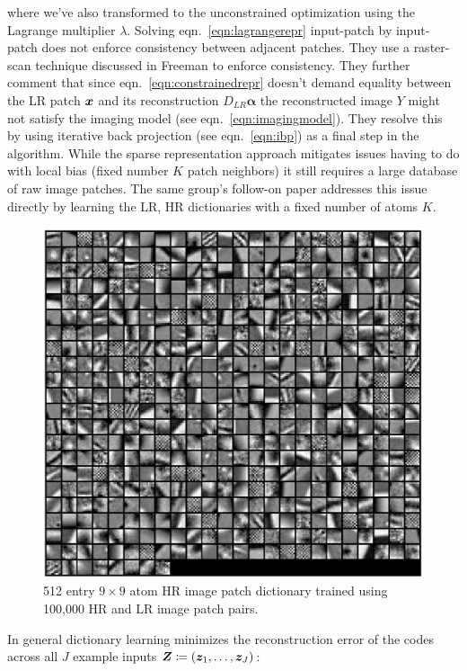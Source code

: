 where we've also transformed to the unconstrained optimization using the Lagrange multiplier \(\lambda\).
%
Solving eqn.~\eqref{eqn:lagrangerepr} input-patch by input-patch does not enforce consistency between adjacent patches.
%
They use a raster-scan technique discussed in Freeman \etal\cite{freeman2002example} to enforce consistency.
%
They further comment that since eqn.~\eqref{eqn:constrainedrepr} doesn't demand equality between the LR patch \(\bm{x}\) and its reconstruction \(D_{LR}\bm{\alpha}\) the reconstructed image \(Y\) might not satisfy the imaging model (see eqn.~\eqref{eqn:imagingmodel}).
%
They resolve this by using iterative back projection (see eqn.~\eqref{eqn:ibp}) as a final step in the algorithm.
%
While the sparse representation approach mitigates issues having to do with local bias (fixed number \(K\) patch neighbors) it still requires a large database of raw image patches.
%
The same group's follow-on paper\cite{yang2010} addresses this issue directly by learning the LR, HR dictionaries with a fixed number of atoms \(K\).
\begin{figure}
    \centering
    \includegraphics[width=\linewidth,keepaspectratio]{figures/classical/dictpatches.png}
    \caption{512 entry \(9 \times 9\) atom HR image patch dictionary trained using 100,000 HR and LR image patch pairs\cite{yang2010}.}
    \label{fig:hrpatchdict}
\end{figure}
%
In general dictionary learning minimizes the reconstruction error of the codes across all \(J\) example inputs \(\bm{Z} \coloneqq \left( \bm{z}_1, \mathellipsis, \bm{z}_J \right)\):
